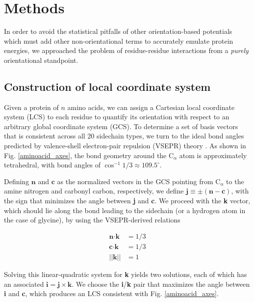 \documentclass[11pt,twocolumn]{article}
\begin{document}
\section{Methods}
In order to avoid the statistical pitfalls of other orientation-based potentials which must add other non-orientational terms to accurately emulate protein energies, we approached the problem of residue-residue interactions from a \emph{purely} orientational standpoint.

\subsection{Construction of local coordinate system}
Given a protein of $n$ amino acids, we can assign a Cartesian local coordinate system (LCS) to each residue to quantify its orientation with respect to an arbitrary global coordinate system (GCS).
To determine a set of basis vectors that is consistent across all 20 sidechain types, we turn to the ideal bond angles predicted by valence-shell electron-pair repulsion (VSEPR) theory \cite{gillespie}.
As shown in Fig. \ref{aminoacid_axes}, the bond geometry around the C$_\alpha$ atom is approximately tetrahedral, with bond angles of $\cos^{-1}{1/3}\approx 109.5^\circ$.

Defining $\textbf{n}$ and $\textbf{c}$ as the normalized vectors in the GCS pointing from C$_\alpha$ to the amine nitrogen and carbonyl carbon, respectively, we define $\textbf{j} \equiv \pm(\textbf{n} - \textbf{c})$, with the sign that minimizes the angle between \textbf{j} and \textbf{c}.
We proceed with the \textbf{k} vector, which should lie along the bond leading to the sidechain (or a hydrogen atom in the case of glycine), by using the VSEPR-derived relations

\begin{align*}
\textbf{n}\cdot\textbf{k} &= 1/3
\\ \textbf{c}\cdot\textbf{k} &= 1/3
\\ ||\textbf{k}|| &= 1
\end{align*}

Solving this linear-quadratic system for \textbf{k} yields two solutions, each of which has an associated $\textbf{i}=\textbf{j}\times\textbf{k}$.
We choose the \textbf{i}/\textbf{k} pair that maximizes the angle between \textbf{i} and \textbf{c}, which produces an LCS consistent with Fig. \ref{aminoacid_axes}.
\end{document}
